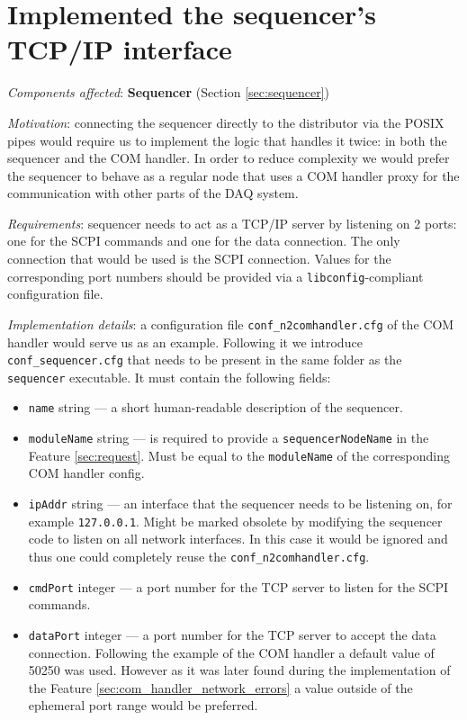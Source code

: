 \section{Implemented the sequencer's TCP/IP interface}
\label{sec:tcp_ip_sequencer}

\textit{Components affected}: \textbf{Sequencer} (Section \ref{sec:sequencer})

\textit{Motivation}: connecting the sequencer directly to the distributor via the POSIX pipes would require us to implement the logic that handles it twice: in both the sequencer and the COM handler. In order to reduce complexity we would prefer the sequencer to behave as a regular node that uses a COM handler proxy for the communication with other parts of the DAQ system.

\textit{Requirements}: sequencer needs to act as a TCP/IP server by listening on 2 ports: one for the SCPI commands and one for the data connection. The only connection that would be used is the SCPI connection. Values for the corresponding port numbers should be provided via a \texttt{libconfig}-compliant configuration file.

\textit{Implementation details}: a configuration file \texttt{conf\_n2comhandler.cfg} of the COM handler would serve us as an example. Following it we introduce \texttt{conf\_sequencer.cfg} that needs to be present in the same folder as the \texttt{sequencer} executable. It must contain the following fields:

\begin{itemize}
	\item \texttt{name} string --- a short human-readable description of the sequencer.
	\item \texttt{moduleName} string --- is required to provide a \texttt{sequencerNodeName} in the Feature \ref{sec:request}. Must be equal to the \texttt{moduleName} of the corresponding COM handler config.
	\item \texttt{ipAddr} string --- an interface that the sequencer needs to be listening on, for example \texttt{127.0.0.1}. Might be marked obsolete by modifying the sequencer code to listen on all network interfaces. In this case it would be ignored and thus one could completely reuse the \texttt{conf\_n2comhandler.cfg}.
	\item \texttt{cmdPort} integer --- a port number for the TCP server to listen for the SCPI commands.
	\item \texttt{dataPort} integer --- a port number for the TCP server to accept the data connection. Following the example of the COM handler a default value of 50250 was used. However as it was later found during the implementation of the Feature \ref{sec:com_handler_network_errors} a value outside of the ephemeral port range would be preferred.
\end{itemize}

